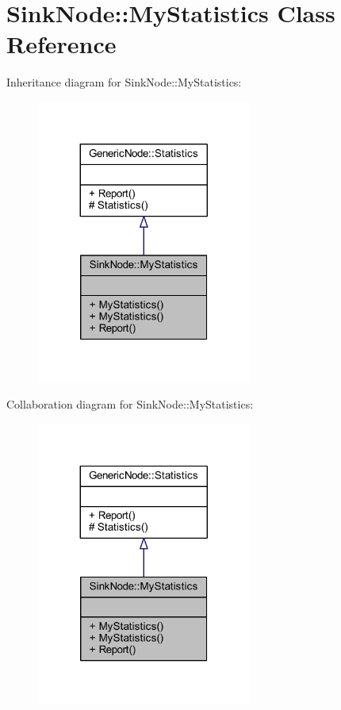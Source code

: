 \hypertarget{class_sink_node_1_1_my_statistics}{}\section{Sink\+Node\+:\+:My\+Statistics Class Reference}
\label{class_sink_node_1_1_my_statistics}


Inheritance diagram for Sink\+Node\+:\+:My\+Statistics\+:
\nopagebreak
\begin{figure}[H]
\begin{center}
\leavevmode
\includegraphics[width=200pt]{class_sink_node_1_1_my_statistics__inherit__graph}
\end{center}
\end{figure}


Collaboration diagram for Sink\+Node\+:\+:My\+Statistics\+:
\nopagebreak
\begin{figure}[H]
\begin{center}
\leavevmode
\includegraphics[width=200pt]{class_sink_node_1_1_my_statistics__coll__graph}
\end{center}
\end{figure}
